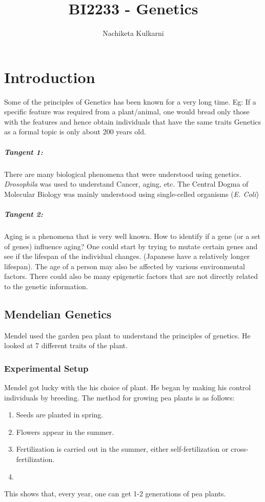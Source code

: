 \documentclass[12pt, oneside]{book}
\date{}
\title{BI2233 - Genetics}
\author{Nachiketa Kulkarni}
\begin{document}
\maketitle
\tableofcontents

\mainmatter
\chapter{Introduction}
Some of the principles of Genetics has been known for a very long time.
Eg: If a specific feature was required from a plant/animal, one would bread only those with the features and hence obtain individuals that have the same traits
Genetics as a formal topic is only about 200 years old.

\paragraph{Tangent 1:} There are many biological phenomena that were understood using genetics.
\textit{Drosophila} was used to understand Cancer, aging, etc.
The Central Dogma of Molecular Biology was mainly understood using single-celled organisms (\textit{E. Coli}) 

\paragraph{Tangent 2:}Aging is a phenomena that is very well known.
How to identify if a gene (or a set of genes) influence aging?
One could start by trying to mutate certain genes and see if the lifespan of the individual changes.
(Japanese have a relatively longer lifespan).
The age of a person may also be affected by various environmental factors.
There could also be many epigenetic factors that are not directly related to the genetic information.

\section{Mendelian Genetics}
Mendel used the garden pea plant to understand the principles of genetics.
He looked at 7 different traits of the plant.

\subsection{Experimental Setup}
Mendel got lucky with the his choice of plant.
He began by making his control individuals by breeding.
The method for growing pea plants is as follows:
\begin{enumerate}
    \item Seeds are planted in spring.
    \item Flowers appear in the summer.
    \item Fertilization is carried out in the summer, either self-fertilization or cross-fertilization.
    \item %
\end{enumerate}
This shows that, every year, one can get 1-2 generations of pea plants.
\end{document}
